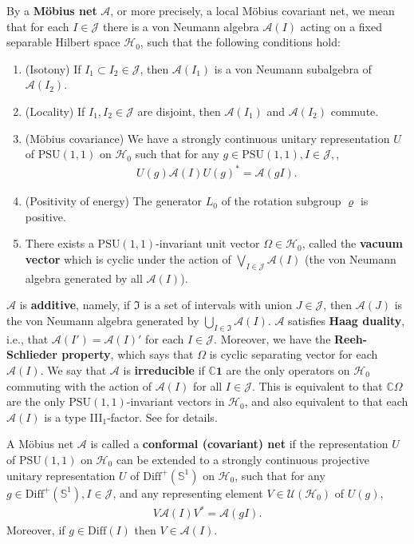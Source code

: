 \documentclass[11pt,b5paper,notitlepage]{article}
\theoremstyle{definition}
\theoremstyle{plain}
\newcommand{\fk}{\mathfrak}
\newcommand{\mc}{\mathcal}
\newcommand{\id}{\mathbf{1}}
\newcommand{\Diffp}{\mathrm{Diff}^+}
\newcommand{\Diff}{\mathrm{Diff}}
\newcommand{\PSU}{\mathrm{PSU}(1,1)}
\newcommand{\mbb}{\mathbb}
\newcommand{\Cbb}{\mathbb C}
\numberwithin{equation}{section}
\begin{document}
By a  \textbf{M\"obius net} $\mc A$, or more precisely, a local M\"obius covariant net, we mean that for each $I\in\mathcal J$ there is a von Neumann algebra $\mathcal A(I)$ acting on a fixed separable Hilbert space $\mathcal H_0$, such that the following conditions hold:
\begin{enumerate}[label=(\alph*)]
\item (Isotony) If $I_1\subset I_2\in\mathcal J$, then $\mathcal A(I_1)$ is a von Neumann subalgebra of $\mathcal A(I_2)$.
\item (Locality) If $I_1,I_2\in\mathcal J$ are disjoint, then $\mathcal A(I_1)$ and $\mathcal A(I_2)$ commute.
\item (M\"obius covariance) We have a strongly continuous  unitary representation $U$ of $\PSU$ on $\mc H_0$ such that for any $g\in\PSU, I\in\mc J,$, 
\begin{align*}
	U(g)\mc A(I)U(g)^*=\mc A(gI).
\end{align*}
\item (Positivity of energy) The generator $L_0$ of the rotation subgroup $\varrho$  is positive.
\item There exists a $\PSU$-invariant unit vector $\Omega\in\mc H_0$, called the \textbf{vacuum vector} which is  cyclic under the action of $\bigvee_{I\in\mathcal J}\mathcal A(I)$ (the von Neumann algebra generated by all $\mathcal A(I)$).
\end{enumerate}

$\mc A$ is \textbf{additive}, namely, if $\fk I$ is a set of intervals with union $J\in\mc J$, then $\mc A(J)$ is the von Neumann algebra generated by $\bigcup_{I\in\fk I}\mc A(I)$. $\mc A$ satisfies \textbf{Haag duality}, i.e., that $\mc A(I')=\mc A(I)'$ for each $I\in \mc J$. Moreover, we have the \textbf{Reeh-Schlieder property}, which says that $\Omega$ is  cyclic separating vector for each $\mc A(I)$. We say that $\mc A$ is \textbf{irreducible} if $\Cbb \id$ are the only operators on $\mc H_0$ commuting with the action of $\mc A(I)$ for all $I\in\mc J$. This is equivalent to that $\Cbb\Omega$ are the only $\PSU$-invariant vectors in $\mc H_0$, and also equivalent to that each $\mc A(I)$ is a type III$_1$-factor.  See \cite[Sec. 1]{GL96} for details.



A M\"obius net $\mc A$ is called a \textbf{conformal (covariant) net} if the representation $U$ of $\PSU$ on $\mc H_0$ can be extended to a strongly continuous projective unitary representation $U$ of $\Diffp(\mbb S^1)$ on $\mathcal H_0$, such that for any $g\in \Diffp(\mbb S^1),I\in\mathcal J$, and any representing element $V\in\mathcal U(\mathcal H_0)$ of $U(g)$,
\begin{align*}
	V\mathcal A(I)V^*=\mathcal A(gI).
\end{align*}
Moreover, if $g\in\Diff(I)$ then $V\in\mc A(I)$.
\end{document}
